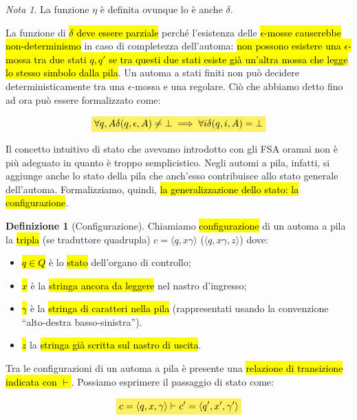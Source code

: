 \documentclass[a4paper,11pt,twoside]{article}
\theoremstyle{plain}
\theoremstyle{definition}
\newtheorem{defn}{Definizione}[section]
\theoremstyle{remark}
\newtheorem*{nota}{Nota}
\newcommand{\mhl}[1]{\colorbox{hlcolor}{$\displaystyle #1$}}
\begin{document}
\begin{nota}
  La funzione $\eta$ è definita ovunque lo è anche $\delta$.
\end{nota}

La funzione di \hl{$\delta$ deve essere parziale} perché l'esistenza delle
\hl{$\epsilon$-mosse causerebbe non-determinismo} in caso di completezza
dell'automa: \hl{non possono esistere una $\epsilon$-mossa tra due stati $q, q'$
se tra questi due stati esiste già un'altra mossa che legge lo stesso simbolo
dalla pila}. Un automa a stati finiti non può decidere deterministicamente tra
una $\epsilon$-mossa e una regolare. Ciò che abbiamo detto fino ad ora può
essere formalizzato come:

\begin{equation}
  \mhl{
  \forall q, A \delta(q, \epsilon, A) \neq \bot \implies
    \forall i \delta(q,i,A) = \bot
  }
\end{equation}

Il concetto intuitivo di stato che avevamo introdotto con gli FSA oramai non è
più adeguato in quanto è troppo semplicistico. Negli automi a pila, infatti, si
aggiunge anche lo stato della pila che anch'esso contribuisce allo stato
generale dell'automa. Formalizziamo, quindi, \hl{la generalizzazione dello
stato: la configurazione}.

\begin{defn}[Configurazione]\label{def:configurazione}
  Chiamiamo \hl{configurazione} di un automa a pila la \hl{tripla} (se traduttore
  quadrupla) $c = \langle q, x \gamma \rangle$
  ($\langle q, x \gamma, z \rangle$) dove:

  \begin{itemize}
    \item \hl{$q \in Q$} è lo \hl{stato} dell'organo di controllo;
    \item \hl{$x$} è la \hl{stringa ancora da leggere} nel nastro d'ingresso;
    \item \hl{$\gamma$} è la \hl{stringa di caratteri nella pila} (rappresentati
      usando la convenzione ``alto-destra basso-sinistra'').
    \item \hl{$z$} la \hl{stringa già scritta sul nastro di uscita}.
  \end{itemize}
\end{defn}

Tra le configurazioni di un automa a pila è presente una \hl{relazione di
transizione indicata con $\vdash$}. Possiamo esprimere il passaggio di stato
come:

\begin{equation}
  \mhl{
  c = \langle q, x, \gamma \rangle \vdash c' = \langle q', x', \gamma' \rangle
  }
\end{equation}
\end{document}

